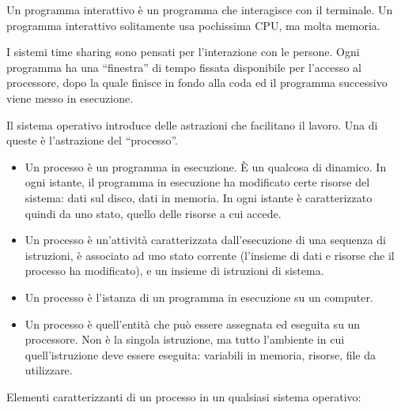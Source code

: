 Un programma interattivo \`e un programma che interagisce con il terminale. Un programma interattivo solitamente usa pochissima CPU, ma molta memoria.

I sistemi time sharing sono pensati per l'interazione con le persone. Ogni programma ha una ``finestra'' di tempo fissata disponibile per l'accesso al processore, dopo la quale finisce in fondo alla coda ed il programma successivo viene messo in esecuzione.

Il sistema operativo introduce delle astrazioni che facilitano il lavoro. Una di queste \`e l'astrazione del ``processo''.

\begin{itemize}
    \item Un processo \`e un programma in esecuzione. \`E un qualcosa di dinamico. In ogni istante, il programma in esecuzione ha modificato certe risorse del sistema: dati sul disco, dati in memoria. In ogni istante \`e caratterizzato quindi da uno stato, quello delle risorse a cui accede.
    \item Un processo \`e un'attivit\`a caratterizzata dall'esecuzione di una sequenza di istruzioni, \`e associato ad uno stato corrente (l'insieme di dati e risorse che il processo ha modificato), e un insieme di istruzioni di sistema.
    \item Un processo \`e l'istanza di un programma in esecuzione su un computer.
    \item Un processo \`e quell'entit\`a che pu\`o essere assegnata ed eseguita su un processore. Non \`e la singola istruzione, ma tutto l'ambiente in cui quell'istruzione deve essere eseguita: variabili in memoria, risorse, file da utilizzare.
\end{itemize}

Elementi caratterizzanti di un processo in un qualsiasi sistema operativo:

